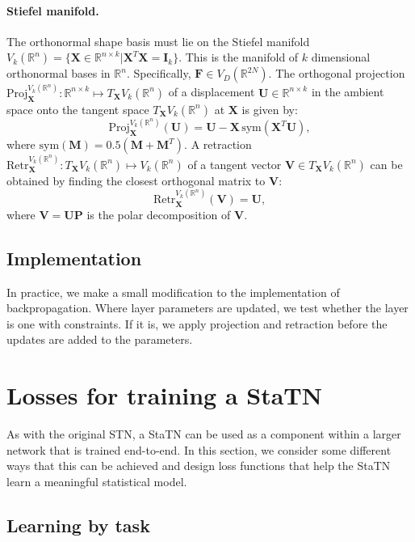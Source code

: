 \documentclass[runningheads]{llncs}
\newcommand{\R}{\mathbb{R}}
\newcommand{\Proj}{\textrm{Proj}}
\newcommand{\Retr}{\textrm{Retr}}
\begin{document}
\paragraph{Stiefel manifold.} The orthonormal shape basis must lie on the Stiefel manifold $V_k(\R^n)=\{\mathbf{X}\in\R^{n\times k} | \mathbf{X}^T\mathbf{X}=\mathbf{I}_k\}$. This is the manifold of $k$ dimensional orthonormal bases in $\R^n$. Specifically, $\mathbf{F}\in V_D(\R^{2N})$. The orthogonal projection $\Proj_{\mathbf{X}}^{V_k(\R^n)}:\R^{n\times k}\mapsto T_{\mathbf{X}}V_k(\R^n)$ of a displacement $\mathbf{U}\in \R^{n\times k}$ in the ambient space onto the tangent space $T_{\mathbf{X}}V_k(\R^n)$ at $\mathbf{X}$ is given by:
\begin{equation}
    \Proj_{\mathbf{X}}^{V_k(\R^n)}(\mathbf{U}) = \mathbf{U}-\mathbf{X}\,\textrm{sym}(\mathbf{X}^T\mathbf{U}),
\end{equation}
where $\textrm{sym}(\mathbf{M})=0.5(\mathbf{M}+\mathbf{M}^T)$. A retraction $\Retr_{\mathbf{X}}^{V_k(\R^n)}:T_{\mathbf{X}}V_k(\R^n)\mapsto V_k(\R^n)$ of a tangent vector $\mathbf{V}\in T_{\mathbf{X}}V_k(\R^n)$ can be obtained by finding the closest orthogonal matrix to $\mathbf{V}$:
\begin{equation}
    \Retr_{\mathbf{X}}^{V_k(\R^n)}(\mathbf{V}) = \mathbf{U},
\end{equation}
where $\mathbf{V} = \mathbf{UP}$ is the polar decomposition of $\mathbf{V}$.

\subsection{Implementation}

In practice, we make a small modification to the implementation of backpropagation. Where layer parameters are updated, we test whether the layer is one with constraints. If it is, we apply projection and retraction before the updates are added to the parameters.

\section{Losses for training a StaTN}

As with the original STN, a StaTN can be used as a component within a larger network that is trained end-to-end. In this section, we consider some different ways that this can be achieved and design loss functions that help the StaTN learn a meaningful statistical model.

\subsection{Learning by task}
\end{document}
